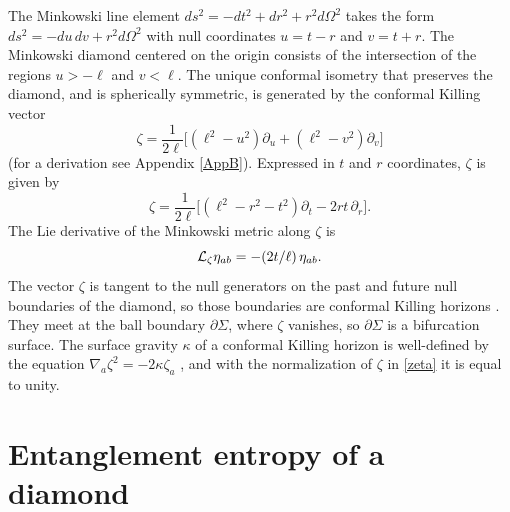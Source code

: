\documentclass[aps,prd,showpacs,groupedaddress,nofootinbib,longbibliography,12pt]{revtex4-1}
\def\beq{\begin{equation}}
\def\eeq{\end{equation}}
\def\z{\zeta}
\def\k{\kappa}
\def\O{\Omega}
\def\L{{\cal L}}
\begin{document}
The Minkowski line element $ds^2 = -dt^2 + dr^2 + r^2d\O^2$ takes the 
form $ds^2 = - du\, dv + r^2d\O^2$ with null coordinates $u=t-r$ and $v=t+r$. 
The Minkowski diamond centered on the origin consists of the intersection of the regions $u>-\ell$ and $v<\ell$. 
The unique conformal isometry that preserves the diamond, and is spherically symmetric, is 
generated by the conformal Killing vector 
%
\beq\label{zeta}
\zeta = \frac{1}{2\ell}\bigl[(\ell^2-u^2)\partial_u +(\ell^2-v^2)\partial_v\bigr]
\eeq
% 
(for a derivation see Appendix \ref{AppB}).
Expressed in $t$ and $r$ coordinates, $\zeta$ is given by
%
\beq
\zeta = \frac{1}{2\ell}\bigl[(\ell^2-r^2-t^2)\partial_t -2rt\, \partial_r\bigr].
\eeq
%
The Lie derivative of the Minkowski metric along $\z$ is 
%
\beq\label{Lieg}
\L_\z \eta_{ab} = -(2t/\ell)\, \eta_{ab}.
\eeq
%
The vector $\z$ is tangent to the null generators on the past and future null boundaries of the diamond, 
so those boundaries are  conformal Killing horizons \cite{1979JMP....20..409D}. 
They meet at the ball boundary $\partial\Sigma$, where $\z$ vanishes,
so $\partial\Sigma$ is a bifurcation 
surface.  The surface gravity $\k$ of a conformal 
Killing horizon is well-defined by the equation $\nabla_a \z^2 = -2\k \z_a$ \cite{Jacobson:1993pf}, 
and with the normalization of $\z$ in \eqref{zeta} it is equal to unity. 

\section{Entanglement entropy of a diamond}
\end{document}
